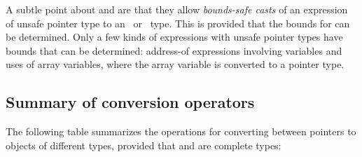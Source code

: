 A subtle point about
 and
are that they allow {\em bounds-safe casts} of an expression
 of unsafe pointer type to an \arrayview\ or
\arrayptr\ type. This is provided that the bounds for 
can be determined. Only a few kinds of expressions with unsafe pointer
types have bounds that can be determined: address-of expressions
involving variables and uses of array variables, where the array
variable is converted to a pointer type.

\subsection{Summary of conversion operators}

The following table summarizes the operations for converting between
pointers to objects of different types, provided that  and  are
complete types:



